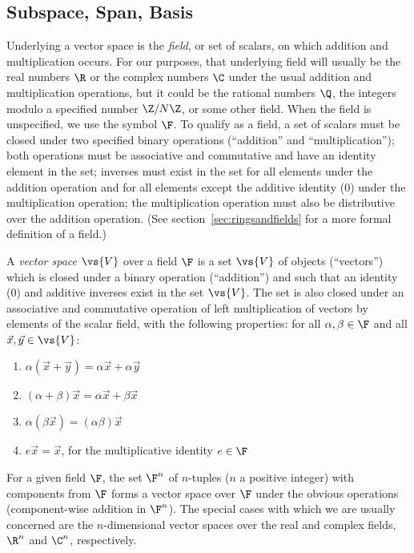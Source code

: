\subsection{Subspace, Span, Basis}
\label{sec:basis}
\begin{definition}
Underlying a vector space is the \emph{field}, or set of scalars, on which
addition and multiplication occurs.  For our purposes, that underlying field
will usually be the real numbers $\R$ or the complex numbers $\C$ under the usual
addition and multiplication operations, but it could be the rational numbers $\Q$,
the integers modulo a specified number $\Z/N\Z$, or some other field.  When the field is
unspecified, we use the symbol $\F$.  To qualify as a field, a set of scalars
must be closed under two specified binary operations (``addition'' and
``multiplication'');  both operations must be associative and commutative and
have an identity element in the set; inverses must exist in the set for all
elements under the addition operation and for all elements except the additive
identity (0) under the multiplication operation; the multiplication operation
must also be distributive over the addition operation. (See
section~\ref{sec:ringsandfields} for a more formal definition of a field.)
\end{definition}
\begin{definition}
A \emph{vector space} $\vs{V}$ over a field $\F$ is a set $\vs{V}$ of objects
(``vectors'') which is closed under a binary operation (``addition'') and such
that an identity (0) and additive inverses exist in the set $\vs{V}$.  The set is
also closed under an associative and commutative operation of left
multiplication of vectors by elements of the scalar field, with the following
properties: 
for all $\alpha, \beta \in \F$ and all $\vec{x},\vec{y}\in \vs{V}$:
\begin{enumerate}
\item $\alpha( \vec{x} + \vec{y} ) = \alpha \vec{x}  + \alpha \vec{y} $
\item $(\alpha+\beta) \vec{x}  = \alpha \vec{x}  + \beta \vec{x} $
\item $\alpha(\beta \vec{x} ) = (\alpha\beta) \vec{x} $
\item $e \vec{x}  =  \vec{x} $, for the multiplicative identity $e\in \F$
\end{enumerate}
\end{definition}
For a given field $\F$, the set $\F^n$ of $n$-tuples ($n$ a positive integer)
with components from $\F$ forms a vector space over $\F$ under the obvious
operations (component-wise addition in $\F^n$).  The special cases with which we
are usually concerned are the $n$-dimensional vector spaces over the real and
complex fields, $\R^n$ and $\C^n$, respectively.

